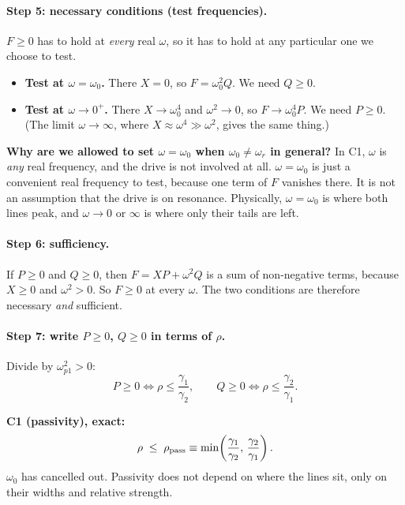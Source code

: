 \documentclass[11pt]{article}
\newcommand{\wpa}{\omega_{p1}}
\begin{document}
\paragraph{Step 5: necessary conditions (test frequencies).}
$F\ge0$ has to hold at \emph{every} real $\omega$, so it has to hold at any particular one we choose to test.
\begin{itemize}
  \item \textbf{Test at $\omega=\omega_0$.} There $X=0$, so $F=\omega_0^2 Q$. We need $Q\ge0$.
  \item \textbf{Test at $\omega\to0^+$.} There $X\to\omega_0^4$ and $\omega^2\to0$, so $F\to\omega_0^4 P$. We need $P\ge0$.
  (The limit $\omega\to\infty$, where $X\approx\omega^4\gg\omega^2$, gives the same thing.)
\end{itemize}

\begin{aside}
\textbf{Why are we allowed to set $\omega=\omega_0$ when $\omega_0\neq\omega_r$ in general?}
In C1, $\omega$ is \emph{any} real frequency, and the drive is not involved at all.
$\omega=\omega_0$ is just a convenient real frequency to test, because one term of $F$ vanishes there.
It is not an assumption that the drive is on resonance.
Physically, $\omega=\omega_0$ is where both lines peak, and $\omega\to0$ or $\infty$ is where only their tails are left.
\end{aside}

\paragraph{Step 6: sufficiency.}
If $P\ge0$ and $Q\ge0$, then $F = XP+\omega^2Q$ is a sum of non-negative terms, because $X\ge0$ and $\omega^2>0$.
So $F\ge0$ at every $\omega$. The two conditions are therefore necessary \emph{and} sufficient.

\paragraph{Step 7: write $P\ge0$, $Q\ge0$ in terms of $\rho$.} Divide by $\wpa^2>0$:
\begin{equation}
  P\ge 0 \iff \rho \le \frac{\gamma_1}{\gamma_2}, \qquad
  Q\ge 0 \iff \rho \le \frac{\gamma_2}{\gamma_1}.
\end{equation}

\begin{result}
\textbf{C1 (passivity), exact:}
\begin{equation}
  \rho \;\le\; \rho_{\rm pass} \equiv \min\!\left(\frac{\gamma_1}{\gamma_2},\,\frac{\gamma_2}{\gamma_1}\right).
  \label{eq:C1}
\end{equation}
$\omega_0$ has cancelled out. Passivity does not depend on where the lines sit, only on their widths and relative strength.
\end{result}
\end{document}
